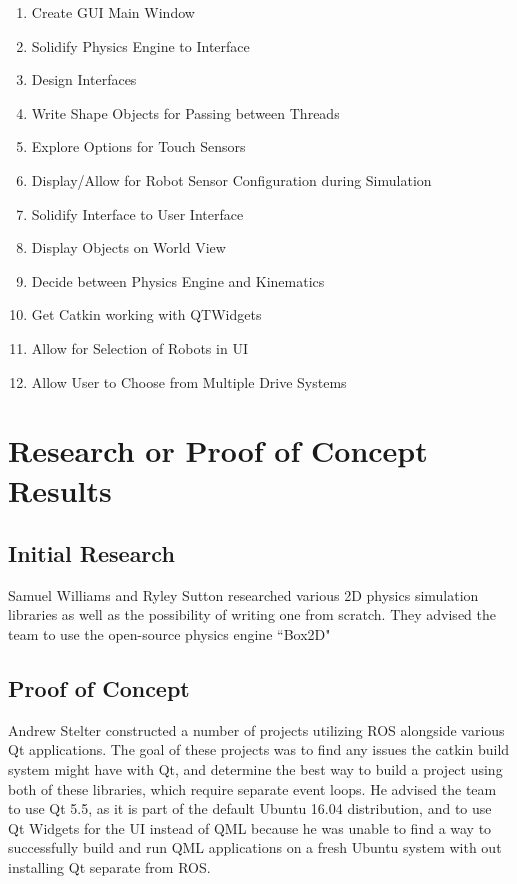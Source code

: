 \begin{itemize}
\begin{enumerate}
\item Create GUI Main Window
\item Solidify Physics Engine to Interface
\item Design Interfaces
\item Write Shape Objects for Passing between Threads
\item Explore Options for Touch Sensors
\item Display/Allow for Robot Sensor Configuration during Simulation
\item Solidify Interface to User Interface
\item Display Objects on World View
\item Decide between Physics Engine and Kinematics
\item Get Catkin working with QTWidgets
\item Allow for Selection of Robots in UI
\item Allow User to Choose from Multiple Drive Systems
\end{enumerate}
\end{itemize}

\section{Research or Proof of Concept Results}
\subsection{Initial Research}
Samuel Williams and Ryley Sutton researched various 2D physics simulation libraries as well as the possibility of writing one from scratch. They advised the team to use the open-source physics engine ``Box2D"

\subsection{Proof of Concept}
Andrew Stelter constructed a number of projects utilizing ROS alongside various Qt applications. The goal of these projects was to find any issues the catkin build system might have with Qt, and determine the best way to build a project using both of these libraries, which require separate event loops. He advised the team to use Qt 5.5, as it is part of the default Ubuntu 16.04 distribution, and to use Qt Widgets for the UI instead of QML because he was unable to find a way to successfully build and run QML applications on a fresh Ubuntu system with out installing Qt separate from ROS.
